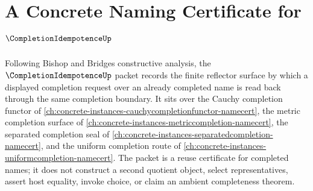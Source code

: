 \chapter{A Concrete Naming Certificate for $\CompletionIdempotenceUp$}
\label{ch:concrete-instances-completion-idempotence-namecert}

Following Bishop and Bridges constructive analysis, the $\CompletionIdempotenceUp$ packet records the finite reflector surface by which a displayed completion request over an already completed name is read back through the same completion boundary. It sits over the Cauchy completion functor of \autoref{ch:concrete-instances-cauchycompletionfunctor-namecert}, the metric completion surface of \autoref{ch:concrete-instances-metriccompletion-namecert}, the separated completion seal of \autoref{ch:concrete-instances-separatedcompletion-namecert}, and the uniform completion route of \autoref{ch:concrete-instances-uniformcompletion-namecert}. The packet is a reuse certificate for completed names; it does not construct a second quotient object, select representatives, assert host equality, invoke choice, or claim an ambient completeness theorem.

